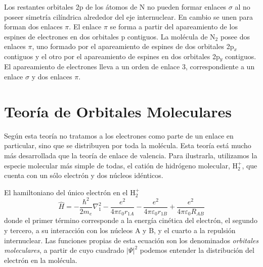 \documentclass{tufte-handout}
\begin{document}
Los restantes orbitales 2p de los átomos de N no pueden
formar enlaces $\sigma$ al no poseer simetría
cilíndrica alrededor del eje internuclear. En cambio se 
unen para forman dos enlaces $\pi$. El enlace $\pi$ se
forma a partir del apareamiento de los espines de 
electrones en dos orbitales p contiguos.
La molécula de N$_2$ posee dos enlaces $\pi$, uno formado
por el apareamiento de espines de dos orbitales 2p$_x$
contiguos y el otro por el apareamiento de espines en
dos orbitales 2p$_y$ contiguos. El apareamiento de
electrones lleva a un orden de enlace 3, correspondiente 
a un enlace $\sigma$ y dos enlaces $\pi$.


\section{Teoría de Orbitales Moleculares}
Según esta teoría no tratamos a los electrones como
parte de un enlace en particular, sino que se distribuyen
por toda la molécula. Esta teoría está mucho más desarrollada
que la teoría de enlace de valencia. Para ilustrarla,
utilizamos la especie molecular más simple de todas, el 
catión de hidrógeno molecular, H$^+_2$, que cuenta con un sólo
electrón y dos núcleos idénticos. 

El hamiltoniano del único electrón en el H$^+_2$
\begin{equation}
\hat{H}=-\frac{\hbar^2}{2m_e}\nabla^2_1-
\frac{e^2}{4\pi \varepsilon_0r_{1A}} - 
\frac{e^2}{4\pi \varepsilon_0r_{1B}} +
\frac{e^2}{4\pi \varepsilon_0R_{AB}}
\end{equation}
donde el primer término corresponde a la energía cinética
del electrón, el segundo y tercero, a su interacción 
con los núcleos A y B, y el cuarto a la repulsión internuclear.
Las funciones propias de esta ecuación son los denominados
\textit{orbitales moleculares}, a partir de cuyo cuadrado
$|\Psi|^2$ podemos entender la distribución del electrón
en la molécula. 
\end{document}
